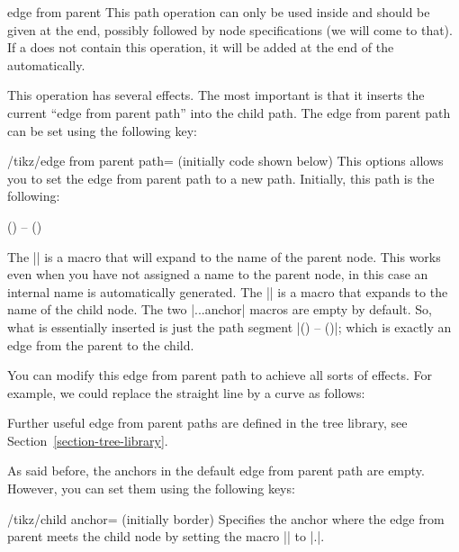 \begin{pathoperation}{edge from parent}{}
  This path operation can only be used inside  and
  should be given at the end, possibly followed by node specifications
  (we will come to that). If a  does not contain this
  operation, it will be added at the end of the 
  automatically.

  This operation has several effects. The most important is that it
  inserts the current ``edge from parent path'' into the child
  path. The edge from parent path can be set using the following
  key:
  \begin{key}{/tikz/edge from parent path= (initially
      \normalfont code shown below)}
    This options allows you to set the edge from parent path to a new
    path. Initially, this path is the following:
\begin{codeexample}
(\tikzparentnode\tikzparentanchor) -- (\tikzchildnode\tikzchildanchor)      
\end{codeexample}
    The |\tikzparentnode| is a macro that will expand to the name of
    the parent node. This works even when you have not assigned a name
    to the parent node, in this case an internal name is automatically
    generated. The |\tikzchildnode| is a macro that expands to the
    name of the child node. The two |...anchor| macros are empty by
    default. So, what is essentially inserted is just the path segment
    |(\tikzparentnode) -- (\tikzchildnode)|; which is exactly an edge
    from the parent to the child.

    You can modify this edge from parent path to achieve all sorts of
    effects. For example, we could replace the straight line by a
    curve as follows:
\begin{codeexample}[]
\end{codeexample}

    Further useful edge from parent paths are defined in the tree
    library, see Section~\ref{section-tree-library}.
  \end{key}

  As said before, the anchors in the default edge from parent path
  are empty. However, you can set them using the following keys:
  \begin{key}{/tikz/child anchor= (initially border)}
    Specifies the anchor where the edge from parent meets the child
    node by setting the macro |\tikzchildanchor| to
    |.|.
    

\end{key}
\end{pathoperation}
